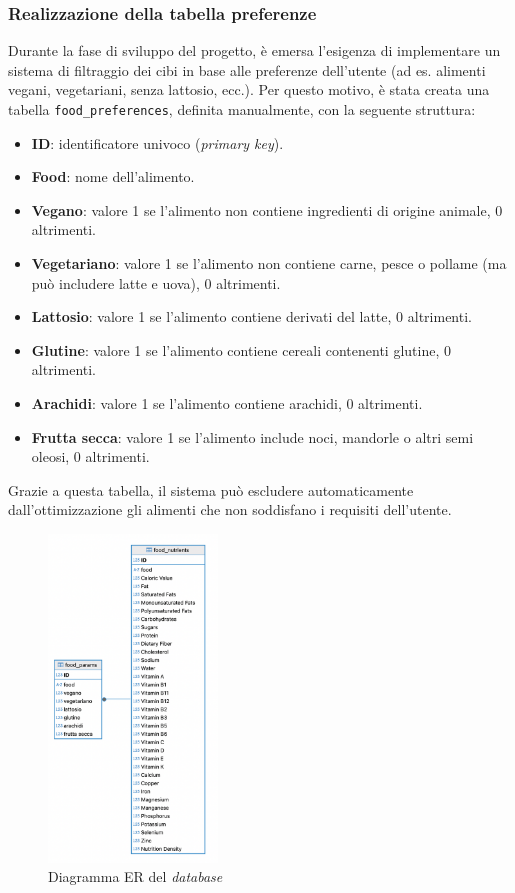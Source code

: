 \documentclass[11pt,a4paper]{article}
\begin{document}
\subsubsection{Realizzazione della tabella preferenze}
Durante la fase di sviluppo del progetto, è emersa l’esigenza di implementare un sistema di filtraggio dei cibi in base alle preferenze dell’utente (ad es. alimenti vegani, vegetariani, senza lattosio, ecc.). Per questo motivo, è stata creata una tabella \texttt{food\_preferences}, definita manualmente, con la seguente struttura:
\begin{itemize}
    \item \textbf{ID}: identificatore univoco (\textit{primary key}).
    \item \textbf{Food}: nome dell’alimento.
    \item \textbf{Vegano}: valore 1 se l’alimento non contiene ingredienti di origine animale, 0 altrimenti.
    \item \textbf{Vegetariano}: valore 1 se l’alimento non contiene carne, pesce o pollame (ma può includere latte e uova), 0 altrimenti.
    \item \textbf{Lattosio}: valore 1 se l’alimento contiene derivati del latte, 0 altrimenti.
    \item \textbf{Glutine}: valore 1 se l’alimento contiene cereali contenenti glutine, 0 altrimenti.
    \item \textbf{Arachidi}: valore 1 se l’alimento contiene arachidi, 0 altrimenti.
    \item \textbf{Frutta secca}: valore 1 se l’alimento include noci, mandorle o altri semi oleosi, 0 altrimenti.
\end{itemize}

Grazie a questa tabella, il sistema può escludere automaticamente dall’ottimizzazione gli alimenti che non soddisfano i requisiti dell’utente.

\begin{figure}[h!]
    \centering
    \includegraphics[width=0.4\textwidth]{ER_diagram.png}
    \caption{Diagramma ER del \textit{database}}
    \label{fig:er_diagram}
\end{figure}
\end{document}
